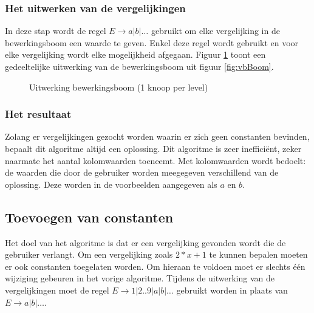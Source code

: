\documentclass[Main.tex]{subfiles}
\begin{document}
\subsubsection*{Het uitwerken van de vergelijkingen}
In deze stap wordt de regel $E \rightarrow a | b | \dotsc$ gebruikt om elke vergelijking in de bewerkingsboom een waarde te geven. Enkel deze regel wordt gebruikt en voor elke vergelijking wordt elke mogelijkheid afgegaan. Figuur \ref{fig:uitwerkingsboom} toont een gedeeltelijke uitwerking van de bewerkingsboom uit figuur \ref{fig:vbBoom}.
\begin{figure}[!htb]
\centering
{}
\caption{Uitwerking bewerkingsboom (1 knoop per level)} \label{fig:uitwerkingsboom}
\end{figure}

\subsubsection*{Het resultaat}
Zolang er vergelijkingen gezocht worden waarin er zich geen constanten bevinden, bepaalt dit algoritme altijd een oplossing. Dit algoritme is zeer ineffici\"ent, zeker naarmate het aantal kolomwaarden toeneemt. Met kolomwaarden wordt bedoelt: de waarden die door de gebruiker worden meegegeven verschillend van de oplossing. Deze worden in de voorbeelden aangegeven als $a$ en $b$.

\subsection{Toevoegen van constanten}
Het doel van het algoritme is dat er een vergelijking gevonden wordt die de gebruiker verlangt. Om een vergelijking zoals $2 \ast x+1$ te kunnen bepalen moeten er ook constanten toegelaten worden. Om hieraan te voldoen moet er slechts \'e\'en wijziging gebeuren in het vorige algoritme. Tijdens de uitwerking van de vergelijkingen moet de regel $E \rightarrow 1 | 2 .. 9 | a | b | \dotsc$ gebruikt worden in plaats van $E \rightarrow a | b | \dotsc$.
\end{document}
